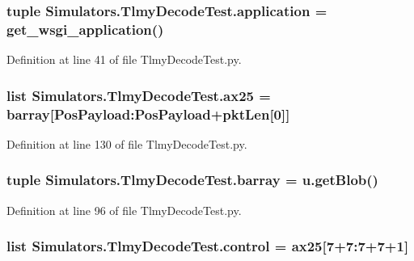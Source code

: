 \subsubsection[{application}]{\setlength{\rightskip}{0pt plus 5cm}tuple Simulators.\+Tlmy\+Decode\+Test.\+application = get\+\_\+wsgi\+\_\+application()}\label{namespace_simulators_1_1_tlmy_decode_test_a51f14e6b84a52552161b97798ed7a930}


Definition at line 41 of file Tlmy\+Decode\+Test.\+py.

\hypertarget{namespace_simulators_1_1_tlmy_decode_test_ab722e6f19835692ab6fc8586a9c2bf56}{}
\subsubsection[{ax25}]{\setlength{\rightskip}{0pt plus 5cm}list Simulators.\+Tlmy\+Decode\+Test.\+ax25 = {\bf barray}\mbox{[}Pos\+Payload\+:\+Pos\+Payload+{\bf pkt\+Len}\mbox{[}0\mbox{]}\mbox{]}}\label{namespace_simulators_1_1_tlmy_decode_test_ab722e6f19835692ab6fc8586a9c2bf56}


Definition at line 130 of file Tlmy\+Decode\+Test.\+py.

\hypertarget{namespace_simulators_1_1_tlmy_decode_test_a444bda3b0c9df222c86fe82e69c6fe1a}{}
\subsubsection[{barray}]{\setlength{\rightskip}{0pt plus 5cm}tuple Simulators.\+Tlmy\+Decode\+Test.\+barray = u.\+get\+Blob()}\label{namespace_simulators_1_1_tlmy_decode_test_a444bda3b0c9df222c86fe82e69c6fe1a}


Definition at line 96 of file Tlmy\+Decode\+Test.\+py.

\hypertarget{namespace_simulators_1_1_tlmy_decode_test_acc0c5ea1fa6814b724d1eab5f3a39581}{}
\subsubsection[{control}]{\setlength{\rightskip}{0pt plus 5cm}list Simulators.\+Tlmy\+Decode\+Test.\+control = {\bf ax25}\mbox{[}7+7\+:7+7+1\mbox{]}}\label{namespace_simulators_1_1_tlmy_decode_test_acc0c5ea1fa6814b724d1eab5f3a39581}


